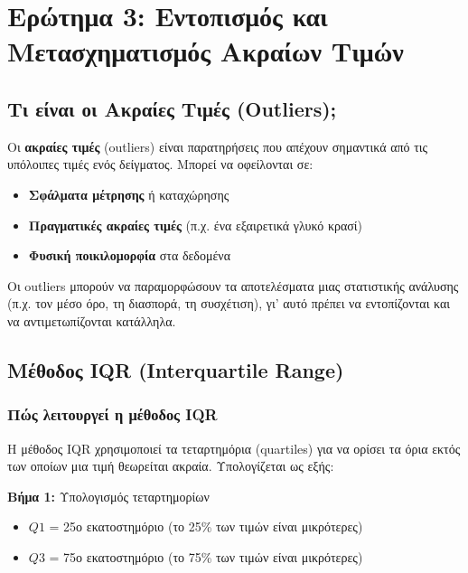 \documentclass[12pt,a4paper]{article}
\begin{document}
\newpage
\section{Ερώτημα 3: Εντοπισμός και Μετασχηματισμός Ακραίων Τιμών}

\subsection{Τι είναι οι Ακραίες Τιμές (Outliers);}

Οι \textbf{ακραίες τιμές} (outliers) είναι παρατηρήσεις που απέχουν σημαντικά από τις υπόλοιπες τιμές ενός δείγματος. Μπορεί να οφείλονται σε:

\begin{itemize}
    \item \textbf{Σφάλματα μέτρησης} ή καταχώρησης
    \item \textbf{Πραγματικές ακραίες τιμές} (π.χ. ένα εξαιρετικά γλυκό κρασί)
    \item \textbf{Φυσική ποικιλομορφία} στα δεδομένα
\end{itemize}

Οι outliers μπορούν να παραμορφώσουν τα αποτελέσματα μιας στατιστικής ανάλυσης (π.χ. τον μέσο όρο, τη διασπορά, τη συσχέτιση), γι' αυτό πρέπει να εντοπίζονται και να αντιμετωπίζονται κατάλληλα.

\subsection{Μέθοδος IQR (Interquartile Range)}

\subsubsection{Πώς λειτουργεί η μέθοδος IQR}

Η μέθοδος IQR χρησιμοποιεί τα τεταρτημόρια (quartiles) για να ορίσει τα όρια εκτός των οποίων μια τιμή θεωρείται ακραία. Υπολογίζεται ως εξής:

\textbf{Βήμα 1:} Υπολογισμός τεταρτημορίων
\begin{itemize}
    \item $Q1$ = 25ο εκατοστημόριο (το 25\% των τιμών είναι μικρότερες)
    \item $Q3$ = 75ο εκατοστημόριο (το 75\% των τιμών είναι μικρότερες)
\end{itemize}
\end{document}
